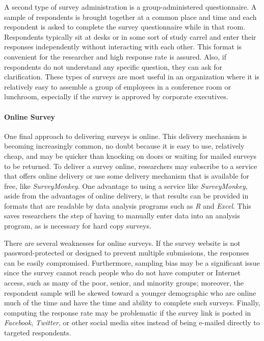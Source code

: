 A second type of survey administration is a group-administered questionnaire. A sample of respondents is brought together at a common place and time and each respondent is asked to complete the survey questionnaire while in that room. Respondents typically sit at desks or in some sort of study carrel and enter their responses independently without interacting with each other. This format is convenient for the researcher and high response rate is assured. Also, if respondents do not understand any specific question, they can ask for clarification. These types of surveys are most useful in an organization where it is relatively easy to assemble a group of employees in a conference room or lunchroom, especially if the survey is approved by corporate executives.

\paragraph{Online Survey}

One final approach to delivering surveys is online. This delivery mechanism is becoming increasingly common, no doubt because it is easy to use, relatively cheap, and may be quicker than knocking on doors or waiting for mailed surveys to be returned. To deliver a survey online, researchers may subscribe to a service that offers online delivery or use some delivery mechanism that is available for free, like \textit{SurveyMonkey}. One advantage to using a service like \textit{SurveyMonkey}, aside from the advantages of online delivery, is that results can be provided in formats that are readable by data analysis programs such as \textit{R} and \textit{Excel}. This saves researchers the step of having to manually enter data into an analysis program, as is necessary for hard copy surveys.

There are several weaknesses for online surveys. If the survey website is not password-protected or designed to prevent multiple submissions, the responses can be easily compromised. Furthermore, sampling bias may be a significant issue since the survey cannot reach people who do not have computer or Internet access, such as many of the poor, senior, and minority groups; moreover, the respondent sample will be skewed toward a younger demographic who are online much of the time and have the time and ability to complete such surveys. Finally, computing the response rate may be problematic if the survey link is posted in \textit{Facebook}, \textit{Twitter}, or other social media sites instead of being e-mailed directly to targeted respondents. 

